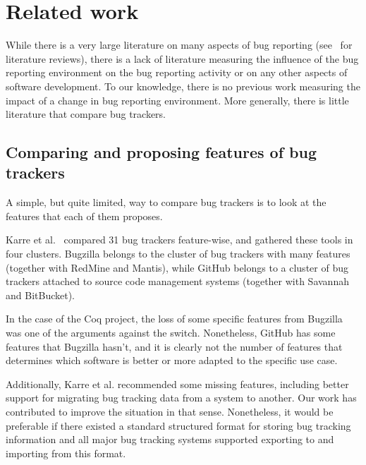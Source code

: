 \documentclass[conference]{IEEEtran}
\begin{document}
\section{Related work}

\label{related-work}

While there is a very large literature on many aspects of bug reporting (see~\cite{strate2013literature, zhang2016literature} for literature reviews), there is a lack of literature measuring the influence of the bug reporting environment on the bug reporting activity or on any other aspects of software development. To our knowledge, there is no previous work measuring the impact of a change in bug reporting environment. More generally, there is little literature that compare bug trackers.

\subsection{Comparing and proposing features of bug trackers}

A simple, but quite limited, way to compare bug trackers is to look at the features that each of them proposes.

Karre et al.~\cite{karre2017does} compared 31 bug trackers feature-wise, and gathered these tools in four clusters. Bugzilla belongs to the cluster of bug trackers with many features (together with RedMine and Mantis), while GitHub belongs to a cluster of bug trackers attached to source code management systems (together with Savannah and BitBucket).

In the case of the Coq project, the loss of some specific features from Bugzilla was one of the arguments against the switch. Nonetheless, GitHub has some features that Bugzilla hasn't, and it is clearly not the number of features that determines which software is better or more adapted to the specific use case.


Additionally, Karre et al. recommended some missing features, including better support for migrating bug tracking data from a system to another. Our work has contributed to improve the situation in that sense. Nonetheless, it would be preferable if there existed a standard structured format for storing bug tracking information and all major bug tracking systems supported exporting to and importing from this format.
\end{document}

